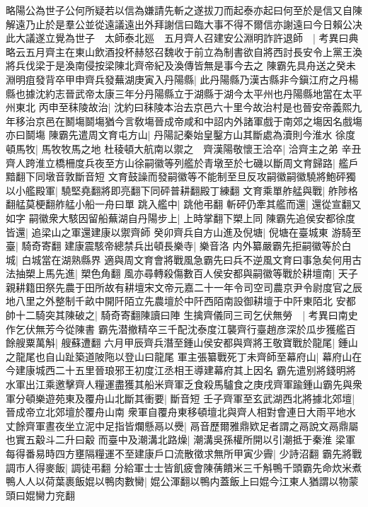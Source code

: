 略陽公為世子公何所疑若以信為嫌請先斬之遂拔刀而起泰亦起曰何至於是信又自陳解遠乃止於是羣公並從遠議遠出外拜謝信曰臨大事不得不爾信亦謝遠曰今日賴公决此大議遂立覺為世子　太師泰北廵　五月齊人召建安公淵明詐許退師　|{
	考異曰典略云五月齊主在東山飲酒投杯赫怒召魏收于前立為制書欲自將西討長安令上黨王渙將兵伐梁于是渙南侵按梁陳北齊帝紀及渙傳皆無是事今去之}
陳霸先具舟送之癸未淵明疽發背卒甲申齊兵發蕪湖庚寅入丹陽縣|{
	此丹陽縣乃漢古縣非今鎭江府之丹楊縣也據沈約志晉武帝太康三年分丹陽縣立于湖縣于湖今太平州也丹陽縣地當在太平州東北}
丙申至秣陵故治|{
	沈約曰秣陵本治去京邑六十里今故治村是也晉安帝義熙九年移治京邑在鬭塲鬬塲猶今言敎塲晉成帝咸和中詔内外諸軍戲于南郊之塲因名戲塲亦曰鬬塲}
陳霸先遣周文育屯方山|{
	丹陽記秦始皇鑿方山其斷處為瀆則今淮水}
徐度頓馬牧|{
	馬牧牧馬之地}
杜稜頓大航南以禦之　齊漢陽敬懷王洽卒|{
	洽齊主之弟}
辛丑齊人跨淮立橋柵度兵夜至方山徐嗣徽等列艦於青墩至於七磯以斷周文育歸路|{
	艦戶黯翻下同墩音敦斷音短}
文育鼓譟而發嗣徽等不能制至旦反攻嗣徽嗣徽驍將鮑砰獨以小艦殿軍|{
	驍堅堯翻將即亮翻下同砰普耕翻殿丁練翻}
文育乘單舴艋與戰|{
	舴陟格翻艋莫梗翻舴艋小船一舟曰單}
跳入艦中|{
	跳他弔翻}
斬砰仍牽其艦而還|{
	還從宣翻又如字}
嗣徽衆大駭因留船蕪湖自丹陽步上|{
	上時掌翻下槊上同}
陳霸先追侯安都徐度皆還|{
	追梁山之軍還建康以禦齊師}
癸卯齊兵自方山進及倪塘|{
	倪塘在臺城東}
游騎至臺|{
	騎奇寄翻}
建康震駭帝總禁兵出頓長樂寺|{
	樂音洛}
内外纂嚴霸先拒嗣徽等於白城|{
	白城當在湖熟縣界}
適與周文育會將戰風急霸先曰兵不逆風文育曰事急矣何用古法抽槊上馬先進|{
	槊色角翻}
風亦尋轉殺傷數百人侯安都與嗣徽等戰於耕壇南|{
	天子親耕籍田祭先農于田所故有耕壇宋文帝元嘉二十一年令司空司農京尹令尉度官之辰地八里之外整制千畝中開阡陌立先農壇於中阡西陌南設御耕壇于中阡東陌北}
安都帥十二騎突其陳破之|{
	騎奇寄翻陳讀曰陣}
生擒齊儀同三司乞伏無勞　|{
	考異曰南史作乞伏無芳今從陳書}
霸先潜撤精卒三千配沈泰度江襲齊行臺趙彦深於瓜步獲艦百餘艘粟萬斛|{
	艘蘇遭翻}
六月甲辰齊兵潛至鍾山侯安都與齊將王敬寶戰於龍尾|{
	鍾山之龍尾也自山趾築道陂陁以登山曰龍尾}
軍主張纂戰死丁未齊師至幕府山|{
	幕府山在今建康城西二十五里晉琅邪王初度江丞相王導建幕府其上因名}
霸先遣别將錢明將水軍出江乘邀擊齊人糧運盡獲其船米齊軍乏食殺馬驢食之庚戌齊軍踰鍾山霸先與衆軍分頓樂遊苑東及覆舟山北斷其衝要|{
	斷音短}
壬子齊軍至玄武湖西北將據北郊壇|{
	晉成帝立北郊壇於覆舟山南}
衆軍自覆舟東移頓壇北與齊人相對會連日大雨平地水丈餘齊軍晝夜坐立泥中足指皆爛懸鬲以㸑|{
	鬲音歷爾雅鼎欵足者謂之鬲說文鬲鼎屬也實五觳斗二升曰觳}
而臺中及潮溝北路燥|{
	潮溝吳孫權所開以引潮抵于秦淮}
梁軍每得番易時四方壅隔糧運不至建康戶口流散徵求無所甲寅少霽|{
	少詩沼翻}
霸先將戰調市人得麥飯|{
	調徒弔翻}
分給軍士士皆飢疲會陳蒨饋米三千斛鴨千頭霸先命炊米煮鴨人人以荷葉裹飯婫以鴨肉數臠|{
	婫公渾翻以鴨内蓋飯上曰婫今江東人猶謂以物蒙頭曰婫臠力兖翻}
